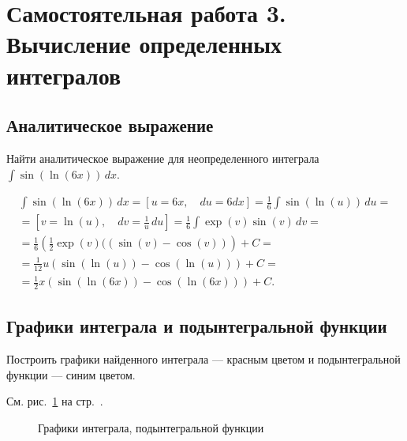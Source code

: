 \documentclass[10pt, a4paper, titlepage]{article}
\begin{document}
\clearpage
\section{Самостоятельная работа \textnumero{} 3. Вычисление определенных интегралов}

\subsection*{Аналитическое выражение}

Найти аналитическое выражение для неопределенного интеграла $\int \sin(\ln(6x))\,dx$.

\begin{multline*}
    \int\sin(\ln(6x))\,dx =
    \left[u=6x, \quad du=6dx\right] =
    \frac{1}{6}\int\sin(\ln(u))\,du = \\ =
    \left[v=\ln(u), \quad dv=\frac{1}{u}\,du\right] =
    \frac{1}{6}\int\exp(v)\sin(v)\,dv = \\ =
    \frac{1}{6}\left(\frac{1}{2}\exp(v)((\sin(v)-\cos(v))\right)+C = \\ =
    \frac{1}{12}u(\sin(\ln(u))-\cos(\ln(u)))+C = \\ =
    \frac{1}{2}x(\sin(\ln(6x))-\cos(\ln(6x)))+C.
\end{multline*}

\subsection*{Графики интеграла и подынтегральной функции}

Построить графики найденного интеграла --- красным цветом и подынтегральной функции --- синим цветом.

См. рис.~\ref{sr3Functions} на стр.~\pageref{sr3Functions}.

\begin{figure}[htb]
    \caption{Графики интеграла, подынтегральной функции}
    \label{sr3Functions}
\end{figure}
\end{document}
